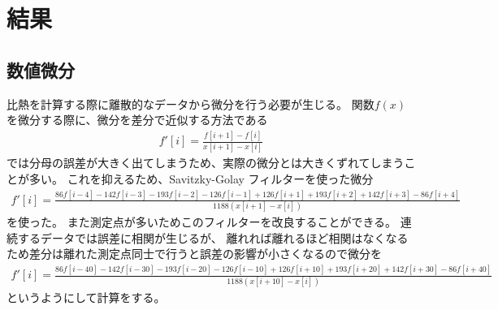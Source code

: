 \documentclass[9pt,dvipdfmx,a4paper]{jsarticle}
\begin{document}
\section{結果}
\subsection{数値微分}
比熱を計算する際に離散的なデータから微分を行う必要が生じる。
関数\(f(x)\)を微分する際に、微分を差分で近似する方法である
\begin{align}
    f'[i] = \frac{f[i+1]-f[i]}{x[i+1]-x[i]}
\end{align}
では分母の誤差が大きく出てしまうため、実際の微分とは大きくずれてしまうことが多い。
これを抑えるため、Savitzky-Golay フィルターを使った微分
\begin{align}
    f'[i] = \frac{86f[i-4]-142f[i-3]-193f[i-2]-126f[i-1]+126f[i+1]+193f[i+2]+142f[i+3]-86f[i+4]}{1188(x[i+1]-x[i])}
\end{align}
を使った。
また測定点が多いためこのフィルターを改良することができる。
連続するデータでは誤差に相関が生じるが、
離れれば離れるほど相関はなくなるため差分は離れた測定点同士で行うと誤差の影響が小さくなるので微分を
\begin{align}
    f'[i] = \frac{86f[i-40]-142f[i-30]-193f[i-20]-126f[i-10]+126f[i+10]+193f[i+20]+142f[i+30]-86f[i+40]}{1188( x[i+10]-x[i])}
\end{align}
というようにして計算をする。
\end{document}

